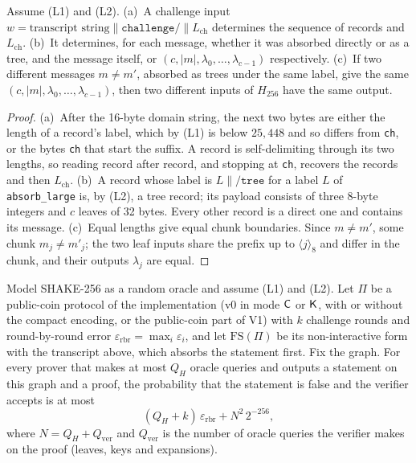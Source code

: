 \begin{lemma}
\label{lem:tree-dec}
Assume (L1) and (L2). (a)~A challenge input
$w=\text{transcript string}\|\texttt{challenge/}\|L_{\mathrm{ch}}$ determines the sequence of
records and $L_{\mathrm{ch}}$. (b)~It determines, for each message, whether it was absorbed directly
or as a tree, and the message itself, or $(c,|m|,\lambda_0,\dots,\lambda_{c-1})$ respectively.
(c)~If two different messages $m\neq m'$, absorbed as trees under the same label, give the same
$(c,|m|,\lambda_0,\dots,\lambda_{c-1})$, then two different inputs of $H_{256}$ have the same
output.
\end{lemma}

\begin{proof}
(a)~After the 16-byte domain string, the next two bytes are either the length of a record's label,
which by (L1) is below $25{,}448$ and so differs from \texttt{ch}, or the bytes \texttt{ch} that start
the suffix. A record is self-delimiting through its two lengths, so reading record after record,
and stopping at \texttt{ch}, recovers the records and then $L_{\mathrm{ch}}$.
(b)~A record whose label is $L\|\texttt{/tree}$ for a label $L$ of \texttt{absorb\_large} is, by (L2),
a tree record; its payload consists of three 8-byte integers and $c$ leaves of 32 bytes. Every other
record is a direct one and contains its message.
(c)~Equal lengths give equal chunk boundaries. Since $m\neq m'$, some chunk $m_j\neq m'_j$; the two
leaf inputs share the prefix up to $\langle j\rangle_8$ and differ in the chunk, and their outputs
$\lambda_j$ are equal.
\end{proof}

\begin{theorem}
\label{thm:fstree}
Model SHAKE-256 as a random oracle and assume (L1) and (L2). Let $\Pi$ be a public-coin protocol of
the implementation (v0 in mode $\mathsf{C}$ or $\mathsf{K}$, with or without the compact encoding, or the
public-coin part of V1) with $k$ challenge rounds and round-by-round error
$\varepsilon_{\mathrm{rbr}}=\max_i\varepsilon_i$, and let $\mathrm{FS}(\Pi)$ be its non-interactive
form with the transcript above, which absorbs the statement first. Fix the graph. For every prover
that makes at most $Q_H$ oracle queries and outputs a statement on this graph and a proof, the probability that the statement is
false and the verifier accepts is at most
\[
  (Q_H+k)\,\varepsilon_{\mathrm{rbr}}+N^2\,2^{-256},
\]
where $N=Q_H+Q_{\mathrm{ver}}$ and $Q_{\mathrm{ver}}$ is the number of oracle queries the verifier
makes on the proof (leaves, keys and expansions).
\end{theorem}

